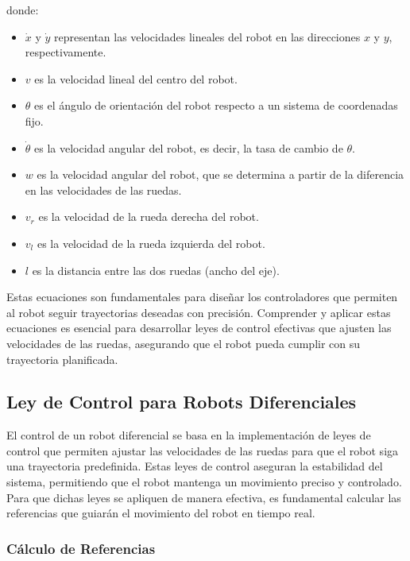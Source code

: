 \documentclass[conference]{IEEEtran}
\begin{document}
\noindent
donde:
\begin{itemize}
    \item \( \dot{x} \) y \( \dot{y} \) representan las velocidades lineales del robot en las direcciones \(x\) y \(y\), respectivamente.
    \item \( v \) es la velocidad lineal del centro del robot.
    \item \( \theta \) es el ángulo de orientación del robot respecto a un sistema de coordenadas fijo.
    \item \( \dot{\theta} \) es la velocidad angular del robot, es decir, la tasa de cambio de \( \theta \).
    \item \( w \) es la velocidad angular del robot, que se determina a partir de la diferencia en las velocidades de las ruedas.
    \item \( v_r \) es la velocidad de la rueda derecha del robot.
    \item \( v_l \) es la velocidad de la rueda izquierda del robot.
    \item \( l \) es la distancia entre las dos ruedas (ancho del eje).
\end{itemize}

Estas ecuaciones son fundamentales para diseñar los controladores que permiten al robot seguir trayectorias deseadas con precisión. Comprender y aplicar estas ecuaciones es esencial para desarrollar leyes de control efectivas que ajusten las velocidades de las ruedas, asegurando que el robot pueda cumplir con su trayectoria planificada.

\subsection{Ley de Control para Robots Diferenciales}

El control de un robot diferencial se basa en la implementación de leyes de control que permiten ajustar las velocidades de las ruedas para que el robot siga una trayectoria predefinida. Estas leyes de control aseguran la estabilidad del sistema, permitiendo que el robot mantenga un movimiento preciso y controlado. Para que dichas leyes se apliquen de manera efectiva, es fundamental calcular las referencias que guiarán el movimiento del robot en tiempo real.

\subsubsection{Cálculo de Referencias}
\end{document}
